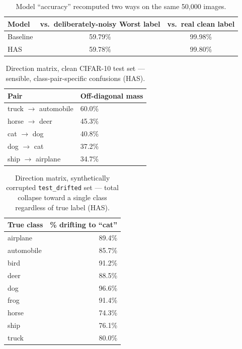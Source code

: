 \begin{table}[htbp]
\centering
\caption{Model ``accuracy'' recomputed two ways on the same 50,000 images.}
\label{tab:extra_cifar10_accuracy_correction}
\begin{tabular}{@{} l cc @{}}
\toprule
\textbf{Model} & \textbf{vs.\ deliberately-noisy Worst label} & \textbf{vs.\ real clean label} \\
\midrule
Baseline & 59.79\% & 99.98\% \\
HAS      & 59.78\% & 99.80\% \\
\bottomrule
\end{tabular}
\end{table}

\begin{table}[htbp]
\centering
\caption{Direction matrix, clean CIFAR-10 test set — sensible, class-pair-specific confusions (HAS).}
\label{tab:extra_direction_clean}
\begin{tabular}{@{} l l @{}}
\toprule
\textbf{Pair} & \textbf{Off-diagonal mass} \\
\midrule
truck $\to$ automobile & 60.0\% \\
horse $\to$ deer       & 45.3\% \\
cat $\to$ dog          & 40.8\% \\
dog $\to$ cat          & 37.2\% \\
ship $\to$ airplane    & 34.7\% \\
\bottomrule
\end{tabular}
\end{table}

\begin{table}[htbp]
\centering
\caption{Direction matrix, synthetically corrupted \texttt{test\_drifted} set — total collapse toward a single class regardless of true label (HAS).}
\label{tab:extra_direction_drifted}
\begin{tabular}{@{} l r @{}}
\toprule
\textbf{True class} & \textbf{\% drifting to ``cat''} \\
\midrule
airplane   & 89.4\% \\
automobile & 85.7\% \\
bird       & 91.2\% \\
deer       & 88.5\% \\
dog        & 96.6\% \\
frog       & 91.4\% \\
horse      & 74.3\% \\
ship       & 76.1\% \\
truck      & 80.0\% \\
\bottomrule
\end{tabular}
\end{table}


